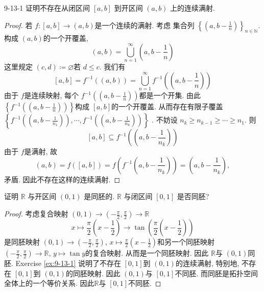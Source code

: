 \documentclass[../main.tex]{subfiles}
\begin{document}
\begin{exercise}{}{9-13-1}
证明不存在从闭区间 $[a, b]$ 到开区间 $(a, b)$ 上的连续满射.
\end{exercise}

\begin{proof}
  若 \(  f: [a,b]  \to (a,b)\)是一个连续的满射. 考虑 集合列 \(  \left\{ \left( a, b-\frac{1 }{n }  \right)  \right\}_{ n \in \mathbb{N} }  \). 构成 \(  \left( a,b \right)   \)的一个开覆盖, \[
  \left( a,b \right)= \bigcup _{n = 1}^{\infty}\left( a,b-\frac{1 }{n }  \right)  
  \]  这里规定 \(  \left( c,d \right)\coloneqq \varnothing   \)若 \(  d\le  c  \).   我们有 \[
  \left[ a,b \right]= f^{-1} \left( \left( a,b \right)  \right)= \bigcup _{n = 1}^{\infty}f^{-1} \left( \left( a, b-\frac{1 }{n }  \right)  \right)   
  \] 由于 \(  f  \)是连续映射, 每个 \(  f^{-1} \left( \left( a,b-\frac{1 }{n }  \right)  \right)   \)都是一个开集.  由此 \(  \left\{ f^{-1} \left( \left( a,b-\frac{1 }{n }  \right)  \right)  \right\}  \)构成 \(  [a,b]  \)的一个开覆盖. 从而存在有限子覆盖 \(  \left\{ f^{-1} \left( \left( a,b-\frac{1 }{n_1 }  \right)  \right),\cdots , f ^{-1} \left( \left( a,b-\frac{1 }{n_{k} }  \right)  \right)   \right\}  \)   . 不妨设 \(  n_{k}\ge n_{k-1}\ge \cdots \ge n_{1}  \). 则 \[
  [a,b]\subseteq f^{-1} \left( \left( a,b-\frac{1 }{n_{k} }  \right)  \right) 
  \] 由于 \(  f  \)是满射, 故 \[
  \left( a,b \right)= f\left( [a,b] \right)=  f \left( f^{-1} \left( a,b- \frac{1 }{n_{k} }  \right)  \right)= \left( a, b-\frac{1 }{n_{k} }  \right)    ,
  \]  矛盾. 因此不存在这样的连续满射.
\end{proof}
\begin{exercise}{}{}
证明 $\mathbb{R}$ 与开区间 $(0, 1)$ 是同胚的. $\mathbb{R}$ 与闭区间 $[0, 1]$ 是否同胚?
\end{exercise}

\begin{proof}
  考虑复合映射 \(  (0,1)\to (-\frac{ \pi }{2 },\frac{ \pi }{2 }  ) \to \mathbb{R}  \)   \[
  x\mapsto \frac{ \pi }{2 }\left( x-\frac{1 }{2 }  \right) \to \tan \left( \frac{ \pi }{2 }\left( x-\frac{1 }{2 }  \right)   \right)  
  \]是同胚映射 \(  (0,1)\to \left( -\frac{ \pi }{2 },\frac{ \pi }{2 }   \right)   \), \(  x\mapsto \frac{ \pi }{2 }\left( x-\frac{1 }{2 }  \right)    \)和另一个同胚映射 \(  \left( -\frac{ \pi }{2 },\frac{ \pi }{2 }   \right)\to \mathbb{R}    \),  \(  y\mapsto  \tan y  \)的复合映射.  从而是一个同胚映射. 因此 \(  \mathbb{R}   \)与 \(  (0,1)  \)同胚.    Exercise \ref{ex:9-13-1} 说明了不存在 \(   \left[ 0,1 \right]   \)到 \(  (0,1) \)的连续满射, 特别地, 不存在 \(  \left[ 0,1 \right]  \)到 \(   (0,1) \)的同胚映射.    因此 \(  (0,1)  \)与 \(  \left[ 0,1 \right]   \)不同胚. 而同胚是拓扑空间全体上的一个等价关系. 因此\(  \mathbb{R}   \)与 \(  \left[ 0,1 \right]   \)不同胚.    
\end{proof}
\end{document}
